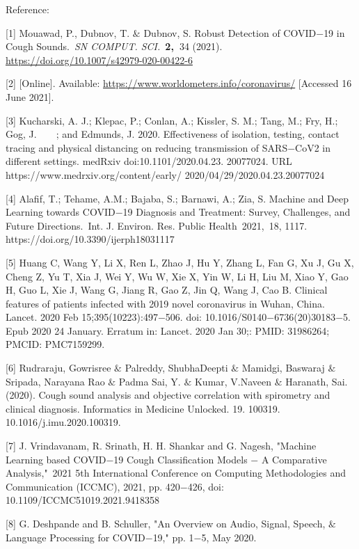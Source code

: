 \documentclass[11pt]{article}
\begin{document}
\begin{itemize}
\vspace{1\baselineskip}
{\LARGE Reference:}

\vspace{1\baselineskip}
[1] \textcolor[HTML]{333333}{Mouawad, P., Dubnov, T. $\&$ Dubnov, S. Robust Detection of COVID$-$19 in Cough Sounds. \textit{SN COMPUT. SCI.} \textbf{2, }34 (2021). \url{https://doi.org/10.1007/s42979-020-00422-6}}

\textcolor[HTML]{333333}{[2] }[Online]. Available: \url{https://www.worldometers.info/coronavirus/} [Accessed 16 June 2021].

[3] Kucharski, A. J.; Klepac, P.; Conlan, A.; Kissler, S. M.; Tang, M.; Fry, H.; Gog, J.\ \ \ \ ; and Edmunds, J. 2020. Effectiveness of isolation, testing, contact tracing and physical distancing on reducing transmission of SARS$-$CoV2 in different settings. medRxiv doi:10.1101/2020.04.23. 20077024. URL https://www.medrxiv.org/content/early/ 2020/04/29/2020.04.23.20077024

[4] \textcolor[HTML]{222222}{Alafif, T.; Tehame, A.M.; Bajaba, S.; Barnawi, A.; Zia, S. Machine and Deep Learning towards COVID$-$19 Diagnosis and Treatment: Survey, Challenges, and Future Directions. Int. J. Environ. Res. Public }Health 2021, 18, 1117. https://doi.org/10.3390/ijerph18031117

[5] Huang C, Wang Y, Li X, Ren L, Zhao J, Hu Y, Zhang L, Fan G, Xu J, Gu X, Cheng Z, Yu T, Xia J, Wei Y, Wu W, Xie X, Yin W, Li H, Liu M, Xiao Y, Gao H, Guo L, Xie J, Wang G, Jiang R, Gao Z, Jin Q, Wang J, Cao B. Clinical features of patients infected with 2019 novel coronavirus in Wuhan, China. Lancet. 2020 Feb 15;395(10223):497$-$506. doi: 10.1016/S0140$-$6736(20)30183$-$5. Epub 2020 24 January. Erratum in: Lancet. 2020 Jan 30;: PMID: 31986264; PMCID: PMC7159299.

[6] Rudraraju, Gowrisree $\&$ Palreddy, ShubhaDeepti $\&$ Mamidgi, Baswaraj $\&$ Sripada, Narayana Rao $\&$ Padma Sai, Y. $\&$ Kumar, V.Naveen $\&$ Haranath, Sai. (2020). Cough sound analysis and objective correlation with spirometry and clinical diagnosis. Informatics in Medicine Unlocked. 19. 100319. 10.1016/j.imu.2020.100319.

[7] J. Vrindavanam, R. Srinath, H. H. Shankar and G. Nagesh, "Machine Learning based COVID$-$19 Cough Classification Models $-$ A Comparative Analysis," 2021 5th International Conference on Computing Methodologies and Communication (ICCMC), 2021, pp. 420$-$426, doi: 10.1109/ICCMC51019.2021.9418358

[8] G. Deshpande and B. Schuller, "An Overview on Audio, Signal, Speech, $\&$ Language Processing for COVID$-$19," pp. 1$-$5, May 2020.


\end{itemize}
\end{document}
